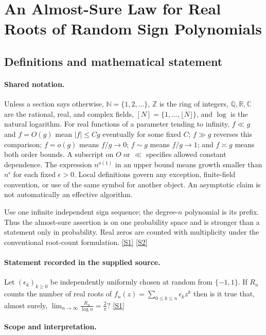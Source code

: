 \documentclass[11pt,a4paper]{article}
\newcommand{\N}{\mathbb{N}}
\newcommand{\Z}{\mathbb{Z}}
\newcommand{\Q}{\mathbb{Q}}
\newcommand{\R}{\mathbb{R}}
\newcommand{\C}{\mathbb{C}}
\newcommand{\sref}[2]{\hyperlink{source:#1:#2}{[S#2]}}
\begin{document}
\section{An Almost-Sure Law for Real Roots of Random Sign Polynomials}\label{statement}


\subsection{Definitions and mathematical statement}

\paragraph{Shared notation.}Unless a section says otherwise, $\N=\{1,2,\ldots\}$,
$\Z$ is the ring of integers, $\Q,\R,\C$ are the rational, real, and complex
fields, $[N]=\{1,\ldots,\lfloor N\rfloor\}$, and $\log$ is the natural
logarithm. For real functions of a parameter tending to infinity,
$f\ll g$ and $f=O(g)$ mean $|f|\leq Cg$ eventually for some fixed $C$;
$f\gg g$ reverses this comparison; $f=o(g)$ means $f/g\to0$;
$f\sim g$ means $f/g\to1$; and $f\asymp g$ means both order bounds.
A subscript on $O$ or $\ll$ specifies allowed constant dependence.
The expression $n^{o(1)}$ in an upper bound means growth smaller than
$n^\epsilon$ for each fixed $\epsilon>0$. Local definitions govern any
exception, finite-field convention, or use of the same symbol for another
object. An asymptotic claim is not automatically an effective algorithm.



Use one infinite independent sign sequence; the degree-$n$ polynomial is its prefix. Thus the almost-sure assertion is on one probability space and is stronger than a statement only in probability. Real zeros are counted with multiplicity under the conventional root-count formulation. \sref{statement}{1} \sref{statement}{2}

\paragraph{Statement recorded in the supplied source.}
Let $(\epsilon_k)_{k\geq 0}$ be independently uniformly chosen at random from $\{-1,1\}$. If $R_n$ counts the number of real roots of $f_n(z)=\sum_{0\leq k\leq n}\epsilon_k z^k$ then is it true that, almost surely, $ \lim_{n\to \infty}\frac{R_n}{\log n}=\frac{2}{\pi}? $ \sref{statement}{1}

\paragraph{Scope and interpretation.}
\end{document}

